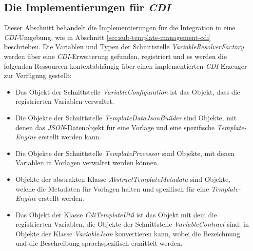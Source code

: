 \subsection{Die Implementierungen für \emph{CDI}}
\label{sec:sub-impl-integartion-cdi}
Dieser Abschnitt behandelt die Implementierungen für die Integration in eine \emph{CDI}-Umgebung, wie in Abschnitt \ref{sec:sub-template-management-cdi} beschrieben. Die Variablen und Typen der Schnittstelle \emph{VariableResolverFactory} werden über eine \emph{CDI}-Erweiterung gefunden,  registriert und es werden die folgenden Ressourcen kontextabhängig über einen implementierten \emph{CDI}-Erzeuger zur Verfügung gestellt: 
\begin{itemize}
 \item Das Objekt der Schnittstelle \emph{VariableConfiguration} 
 \newline
 ist das Objekt, dass die registrierten Variablen verwaltet.
 \item Die Objekte der Schnittstelle \emph{TemplateDataJsonBuilder}
 \newline
 sind Objekte, mit denen das \emph{JSON}-Datenobjekt für eine Vorlage und eine spezifische \emph{Template-Engine} erstellt werden kann.
 \item Die Objekte der Schnittstelle \emph{TemplateProcessor}
 \newline
 sind Objekte, mit denen Variablen in Vorlagen verwaltet werden können.
 \item Objekte der abstrakten Klasse \emph{AbstractTemplateMetadata}
 \newline
 sind Objekte, welche die Metadaten für Vorlagen halten und spezifisch für eine \emph{Template-Engine} erstellt werden.
 \item Das Objekt der Klasse \emph{CdiTemplateUtil}
 \newline
 ist das Objekt mit dem die registrierten Variablen, die Objekte der Schnittstelle \emph{VariableContract} sind, in Objekte der Klasse \emph{VariableJson} konvertieren kann, wobei die Bezeichnung und die Beschreibung sprachspezifisch ermittelt werden.
\end{itemize}

